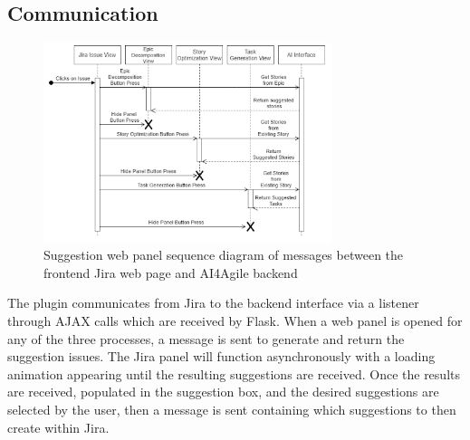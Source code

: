 \subsection{Communication}
\begin{figure}
\centering
\includegraphics[width=0.75\textwidth,keepaspectratio]{./figure/SequenceFlowDiagram.png}
\caption{Suggestion web panel sequence diagram of messages between the frontend Jira web page and AI4Agile backend}
\end{figure}

The plugin communicates from Jira to the backend interface via a listener through AJAX calls which are received by Flask. When a web panel is opened for any of the three processes, a message is sent to generate and return the suggestion issues. The Jira panel will function asynchronously with a loading animation appearing until the resulting suggestions are received. Once the results are received, populated in the suggestion box, and the desired suggestions are selected by the user, then a message is sent containing which suggestions to then create within Jira.

